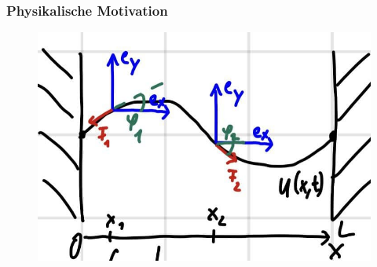 \subsubsection{Physikalische Motivation}
\begin{figure}
 \vspace{-15pt}
\includegraphics[width=.35\textwidth]{Dateien/06/06Saite.jpg}
 \vspace{-15pt}
\end{figure}
